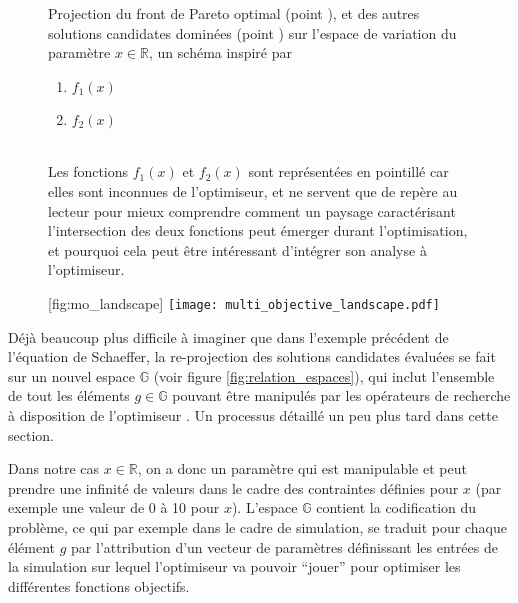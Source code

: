 \begin{figure}[!htbp]
	\begin{sidecaption}{Projection du front de Pareto optimal (point ), et des autres solutions candidates dominées (point ) sur l'espace de variation du paramètre $x \in \mathbb{R}$, un schéma inspiré par \textcite[67]{Weise2011}
	\parbox{\marginparwidth}{
	\begin{enumerate}[label={},labelindent=0pt,leftmargin=*]
	      \item {} $f_{1}(x)$
	      \item {} $f_{2}(x)$
	\end{enumerate}}\\
	Les fonctions $f_{1}(x)$ et $f_{2}(x)$ sont représentées en pointillé car elles sont inconnues de l'optimiseur, et ne servent que de repère au lecteur pour mieux comprendre comment un paysage caractérisant l'intersection des deux fonctions peut émerger durant l'optimisation, et pourquoi cela peut être intéressant d'intégrer son analyse à l'optimiseur.}[fig:mo_landscape]
	 \centering
	 	\texttt{[image: multi\_objective\_landscape.pdf]}
	\end{sidecaption}
\end{figure}


Déjà beaucoup plus difficile à imaginer que dans l'exemple précédent de l'équation de Schaeffer, la re-projection des solutions candidates évaluées se fait sur un nouvel espace $\mathbb{G}$ (voir figure \ref{fig:relation_espaces}), qui inclut l'ensemble de tout les éléments $g \in \mathbb{G}$ pouvant être manipulés par les opérateurs de recherche à disposition de l'optimiseur \autocite[82]{Weise2011}. Un processus détaillé un peu plus tard dans cette section.

Dans notre cas $x \in \mathbb{R}$, on a donc un paramètre qui est manipulable et peut prendre une infinité de valeurs dans le cadre des contraintes définies pour $x$ (par exemple une valeur de 0 à 10 pour $x$). L'espace $\mathbb{G}$ contient la codification du problème, ce qui par exemple dans le cadre de simulation, se traduit pour chaque élément $g$ par l'attribution d'un vecteur de paramètres définissant les entrées de la simulation sur lequel l'optimiseur va pouvoir \enquote{jouer} pour optimiser les différentes fonctions objectifs.

